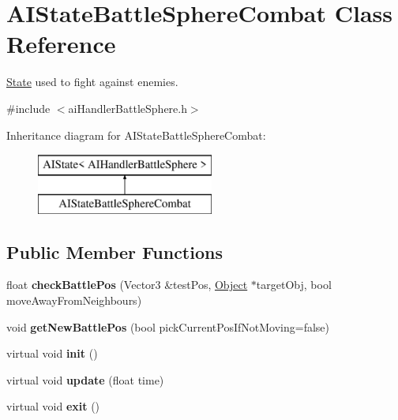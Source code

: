 \hypertarget{classAIStateBattleSphereCombat}{
\section{\-A\-I\-State\-Battle\-Sphere\-Combat \-Class \-Reference}
\label{d9/d37/classAIStateBattleSphereCombat}
}


\hyperlink{classState}{\-State} used to fight against enemies.  




{\ttfamily \#include $<$ai\-Handler\-Battle\-Sphere.\-h$>$}

\-Inheritance diagram for \-A\-I\-State\-Battle\-Sphere\-Combat\-:\begin{figure}[H]
\begin{center}
\leavevmode
\includegraphics[height=2.000000cm]{d9/d37/classAIStateBattleSphereCombat}
\end{center}
\end{figure}
\subsection*{\-Public \-Member \-Functions}
\begin{DoxyCompactItemize}
\item 
\hypertarget{classAIStateBattleSphereCombat_a4a4bc6bb3a8f2de1031ac52c599a09ee}{
float {\bfseries check\-Battle\-Pos} (\-Vector3 \&test\-Pos, \hyperlink{classObject}{\-Object} $\ast$target\-Obj, bool move\-Away\-From\-Neighbours)}
\label{d9/d37/classAIStateBattleSphereCombat_a4a4bc6bb3a8f2de1031ac52c599a09ee}

\item 
\hypertarget{classAIStateBattleSphereCombat_abbec1fb586b9f77fd6939acf28462509}{
void {\bfseries get\-New\-Battle\-Pos} (bool pick\-Current\-Pos\-If\-Not\-Moving=false)}
\label{d9/d37/classAIStateBattleSphereCombat_abbec1fb586b9f77fd6939acf28462509}

\item 
\hypertarget{classAIStateBattleSphereCombat_a714ef7401053d04f4aaeeddd036d79c2}{
virtual void {\bfseries init} ()}
\label{d9/d37/classAIStateBattleSphereCombat_a714ef7401053d04f4aaeeddd036d79c2}

\item 
\hypertarget{classAIStateBattleSphereCombat_a19aefa42e9fdfbfd703ad82164b2e320}{
virtual void {\bfseries update} (float time)}
\label{d9/d37/classAIStateBattleSphereCombat_a19aefa42e9fdfbfd703ad82164b2e320}

\item 
\hypertarget{classAIStateBattleSphereCombat_addfe1b7648c0f3d58899e7f86e8c4df3}{
virtual void {\bfseries exit} ()}
\label{d9/d37/classAIStateBattleSphereCombat_addfe1b7648c0f3d58899e7f86e8c4df3}

\end{DoxyCompactItemize}
